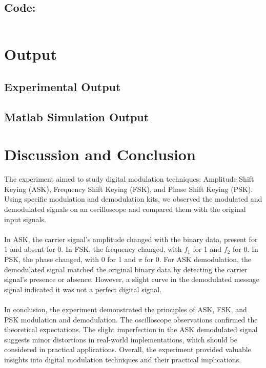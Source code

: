 \documentclass[12pt]{article}
\begin{document}
\subsection*{Code:}
\inputminted[linenos,breaklines,breakanywhere]{matlab}{./assets/dsk.m}

\section*{Output}

\subsection*{Experimental Output}


\subsection*{Matlab Simulation Output}


\section*{Discussion and Conclusion}
The experiment aimed to study digital modulation techniques: Amplitude Shift Keying (ASK), Frequency Shift Keying (FSK), and Phase Shift Keying (PSK). Using specific modulation and demodulation kits, we observed the modulated and demodulated signals on an oscilloscope and compared them with the original input signals.
\\\\
In ASK, the carrier signal's amplitude changed with the binary data, present for 1 and absent for 0. In FSK, the frequency changed, with \( f_1 \) for 1 and \( f_2 \) for 0. In PSK, the phase changed, with 0 for 1 and \( \pi \) for 0. For ASK demodulation, the demodulated signal matched the original binary data by detecting the carrier signal's presence or absence. However, a slight curve in the demodulated message signal indicated it was not a perfect digital signal.
\\\\
In conclusion, the experiment demonstrated the principles of ASK, FSK, and PSK modulation and demodulation. The oscilloscope observations confirmed the theoretical expectations. The slight imperfection in the ASK demodulated signal suggests minor distortions in real-world implementations, which should be considered in practical applications. Overall, the experiment provided valuable insights into digital modulation techniques and their practical implications.


\renewcommand{\bibname}{References}

\end{document}
